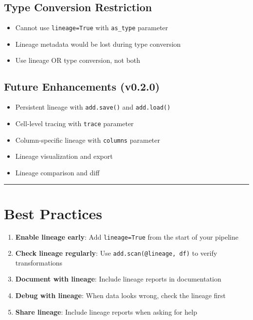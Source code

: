 \documentclass[
  letterpaper,
]{scrbook}
\providecommand{\tightlist}{%
  \setlength{\itemsep}{0pt}\setlength{\parskip}{0pt}}
\begin{document}
\subsection{Type Conversion
Restriction}\label{type-conversion-restriction}

\begin{itemize}
\tightlist
\item
  Cannot use \texttt{lineage=True} with \texttt{as\_type} parameter
\item
  Lineage metadata would be lost during type conversion
\item
  Use lineage OR type conversion, not both
\end{itemize}

\subsection{Future Enhancements
(v0.2.0)}\label{future-enhancements-v0.2.0-1}

\begin{itemize}
\tightlist
\item
  Persistent lineage with \texttt{add.save()} and \texttt{add.load()}
\item
  Cell-level tracing with \texttt{trace} parameter
\item
  Column-specific lineage with \texttt{columns} parameter
\item
  Lineage visualization and export
\item
  Lineage comparison and diff
\end{itemize}

\begin{center}\rule{0.5\linewidth}{0.5pt}\end{center}

\section{Best Practices}\label{best-practices-7}

\begin{enumerate}
\def\labelenumi{\arabic{enumi}.}
\tightlist
\item
  \textbf{Enable lineage early}: Add \texttt{lineage=True} from the
  start of your pipeline
\item
  \textbf{Check lineage regularly}: Use
  \texttt{add.scan(\textquotesingle{}@lineage\textquotesingle{},\ df)}
  to verify transformations
\item
  \textbf{Document with lineage}: Include lineage reports in
  documentation
\item
  \textbf{Debug with lineage}: When data looks wrong, check the lineage
  first
\item
  \textbf{Share lineage}: Include lineage reports when asking for help
\end{enumerate}
\end{document}
